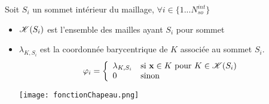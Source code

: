 \documentclass{article}
\begin{document}
Soit $S_i$ un sommet intérieur du maillage, $\forall i \in \{1 . . . N_{so}^{int}\}$
\begin{itemize}
\item ${\cal K}(S_i)$ est l'ensemble des mailles ayant $S_i$ pour sommet
\item $\lambda_{K,S_i}$ est la coordonnée barycentrique de $K$ associée au sommet $S_i$.
\[\varphi_i=\left\{\begin{array}{ll}
\lambda_{K,S_i}& \mbox{si }{\bf x}\in K \mbox{ pour } K\in {\cal K}(S_i)\\
0 & \mbox{sinon }
\end{array}\right.
\]
\begin{center}
\texttt{[image: fonctionChapeau.png]} 
\end{center}
\end{itemize}
\end{document}
